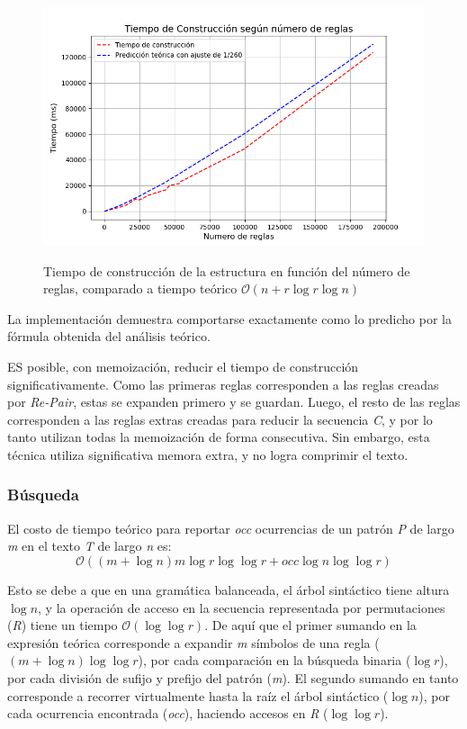 \begin{figure}[h!]
    \centering
    \captionsetup{position=above} %
    \caption{Tiempo de construcción de la estructura en función del número de reglas, comparado a tiempo teórico $\mathcal{O}(n + r \log{r} \log {n})$}
    \includegraphics[width=1\textwidth]{imagenes/Time_Construction.png} %
    \label{fig:timecst}
\end{figure}

La implementación demuestra comportarse exactamente como lo predicho por la fórmula obtenida del análisis teórico.

ES posible, con memoización, reducir el tiempo de construcción significativamente. Como las primeras reglas corresponden a las reglas creadas por \textit{Re-Pair}, estas se expanden primero y se guardan. Luego, el resto de las reglas corresponden a las reglas extras creadas para reducir la secuencia \textit{C}, y por lo tanto utilizan todas la memoización de forma consecutiva. Sin embargo, esta técnica utiliza significativa memora extra, y no logra comprimir el texto. 



\subsubsection{Búsqueda}


El costo de tiempo teórico para reportar \textit{occ} ocurrencias de un patrón \textit{P} de largo \textit{m} en el texto \textit{T} de largo \textit{n} es:
\[
\mathcal{O}( (m + \log{n}) m \log{r} \log{\log{r}} + \textit{occ} \log{n} \log{\log{r}}  )
\]

Esto se debe a que en una gramática balanceada, el árbol sintáctico tiene altura $\log{n}$, y la operación de acceso en la secuencia representada por permutaciones (\textit{R}) tiene un tiempo $\mathcal{O}(\log \log r)$. De aquí que el primer sumando en la expresión teórica corresponde a expandir \textit{m} símbolos de una regla ($(m + \log{n}) \log{\log{r}}$), por cada comparación en la búsqueda binaria ($\log{r}$), por cada división de sufijo y prefijo del patrón (\textit{m}). El segundo sumando en tanto corresponde a recorrer virtualmente hasta la raíz el árbol sintáctico ($\log{n}$), por cada ocurrencia encontrada (\textit{occ}), haciendo accesos en \textit{R} ($\log{\log{r}}$).

